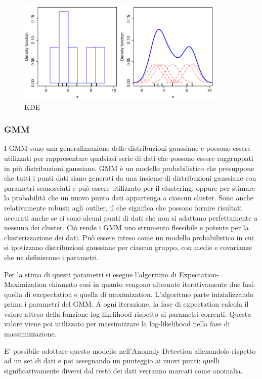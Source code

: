 \begin{figure}[t]
	\centering
	\includegraphics[width=10cm, scale=1]{images/kde_model}
	\caption{KDE}
	\label{kde_model}
\end{figure}


\subsubsection{GMM}
I GMM sono una generalizzazione delle distribuzioni gaussiane e possono essere utilizzati per rappresentare qualsiasi serie di dati che possono essere raggruppati in più distribuzioni gaussiane. GMM è un modello probabilistico che presuppone che tutti i punti dati siano generati da una insieme di distribuzioni gaussiane con parametri sconosciuti e può essere utilizzato per il clustering, oppure per stimare la probabilità che un nuovo punto dati appartenga a ciascun cluster. Sono anche relativamente robusti agli outlier, il che significa che possono fornire risultati accurati anche se ci sono alcuni punti di dati che non si adattano perfettamente a nessuno dei cluster. Ciò rende i GMM uno strumento flessibile e potente per la clusterizzazione dei dati. Può essere inteso come un modello probabilistico in cui si ipotizzano distribuzioni gaussiane per ciascun gruppo, con medie e covarianze che ne definiscono i parametri.

Per la stima di questi parametri si esegue l'algoritmo di Expectation-Maximization chiamato cosi in quanto vengono alternate iterativamente due fasi: quella di excpectation e quella di maximization. L'algoritmo parte inizializzando prima i parametri del GMM. A ogni iterazione, la fase di expectation calcola il valore atteso della funzione log-likelihood rispetto ai parametri correnti. Questa valore viene poi utilizzato per massimizzare la log-likelihood nella fase di massimizzazione.

E' possibile adottare questo modello nell'Anomaly Detection allenandolo rispetto ad un set di dati e poi assegnando un punteggio ai nuovi punti: quelli significativamente diversi dal resto dei dati verranno marcati come anomalia.

